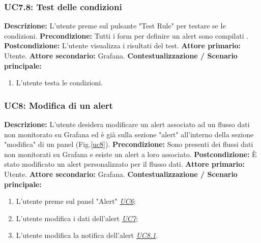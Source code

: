                  \subsubsection{UC7.8: Test delle condizioni }
                    \textbf{Descrizione:} L’utente preme sul pulsante "Test Rule" per testare se le condizioni.
                    \newline
                    \textbf{Precondizione:} Tutti i form per definire un alert sono compilati .
                    \newline
                    \textbf{Postcondizione:} L'utente visualizza i risultati del test.
                    \newline
                    \textbf{Attore primario:} Utente.
                    \newline
                    \textbf{Attore secondario:} Grafana.
                    \newline
                    \textbf{Contestualizzazione / Scenario principale:} \begin{enumerate}
                            \item L'utente testa le condizioni.
                        \end{enumerate}
                        
                        
                		
            
                      		
               \subsubsection{UC8: Modifica di un alert}
                    \textbf{Descrizione:} L’utente desidera modificare un alert associato ad un flusso dati non monitorato su Grafana ed è già sulla sezione "alert" all'interno della sezione "modifica" di un panel (Fig.\ref{uc8}).
                    \newline
                    \textbf{Precondizione:} Sono presenti dei flussi dati non monitorati su Grafana e esiste un alert a loro associato.
                    \newline
                    \textbf{Postcondizione:} È stato modificato un alert personalizzato per il flusso dati.
                    \newline
                    \textbf{Attore primario:} Utente.
                    \newline
                    \textbf{Attore secondario:} Grafana.
                    \newline
                    \textbf{Contestualizzazione / Scenario principale:} \begin{enumerate}
                            \item L'utente preme sul panel "Alert" \underline{\textit{UC6}};
                            \item L'utente modifica i dati dell'alert \underline{\textit{UC7}};
                            \item L'utente modifica la notifica dell'alert \underline{\textit{UC8.1}}.
                        \end{enumerate}
                    
